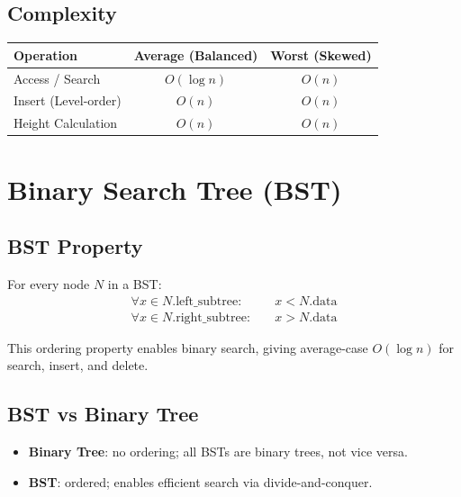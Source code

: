 \documentclass[12pt,a4paper]{article}
\begin{document}
\subsection{Complexity}
\begin{table}[h!]
\centering
\begin{tabular}{|l|c|c|}
\hline
\textbf{Operation}          & \textbf{Average (Balanced)} & \textbf{Worst (Skewed)} \\
\hline
Access / Search             & $O(\log n)$                 & $O(n)$                 \\
Insert (Level-order)        & $O(n)$                      & $O(n)$                 \\
Height Calculation          & $O(n)$                      & $O(n)$                 \\
\hline
\end{tabular}
\end{table}

\newpage

\section{Binary Search Tree (BST)}

\subsection{BST Property}
For every node $N$ in a BST:
\begin{align}
\forall x \in N.\text{left\_subtree}\colon\quad  & x < N.\text{data} \\
\forall x \in N.\text{right\_subtree}\colon\quad & x > N.\text{data}
\end{align}

This ordering property enables binary search, giving average-case $O(\log n)$ for search, insert, and delete.

\subsection{BST vs Binary Tree}
\begin{itemize}
    \item \textbf{Binary Tree}: no ordering; all BSTs are binary trees, not vice versa.
    \item \textbf{BST}: ordered; enables efficient search via divide-and-conquer.
\end{itemize}
\end{document}
